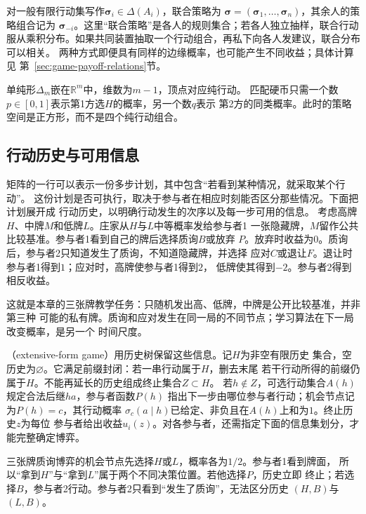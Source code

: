 对一般有限行动集写作\(\bm\sigma_i\in\Delta(A_i)\)，联合策略为
\(\bm\sigma=(\bm\sigma_1,\ldots,\bm\sigma_n)\)，其余人的策略组合记为
\(\bm\sigma_{-i}\)。这里“联合策略”是各人的规则集合；若各人独立抽样，联合行动
服从乘积分布。如果共同装置抽取一个行动组合，再私下向各人发建议，联合分布可以相关。
两种方式即便具有同样的边缘概率，也可能产生不同收益；具体计算见
第~\ref{sec:game-payoff-relations}节。

单纯形\(\Delta_m\)嵌在\(\mathbb R^m\)中，维数为\(m-1\)，顶点对应纯行动。
匹配硬币只需一个数\(p\in[0,1]\)表示第1方选\(H\)的概率，另一个数\(q\)表示
第2方的同类概率。此时的策略空间是正方形，而不是四个纯行动组合。

\subsection{行动历史与可用信息}
\label{sec:game-extensive-information}

矩阵的一行可以表示一份多步计划，其中包含“若看到某种情况，就采取某个行动”。
这份计划是否可执行，取决于参与者在相应时刻能否区分那些情况。下面把计划展开成
行动历史，以明确行动发生的次序以及每一步可用的信息。
考虑高牌\(H\)、中牌\(M\)和低牌\(L\)。庄家从\(H\)与\(L\)中等概率发给参与者1
一张隐藏牌，\(M\)留作公共比较基准。参与者1看到自己的牌后选择质询\(B\)或放弃
\(P\)。放弃时收益为\(0\)。质询后，参与者2只知道发生了质询，不知道隐藏牌，并选择
应对\(C\)或退让\(F\)。退让时参与者1得到\(1\)；应对时，高牌使参与者1得到\(2\)，
低牌使其得到\(-2\)。参与者2得到相反收益。

这就是本章的三张牌教学任务：只随机发出高、低牌，中牌是公开比较基准，并非第三种
可能的私有牌。质询和应对发生在同一局的不同节点；学习算法在下一局改变概率，是另一个
时间尺度。
\begin{definition}[有限扩展式博弈的历史树]
\label{def:game-finite-extensive-history}
（extensive-form game）用历史树保留这些信息。记\(H\)为非空有限历史
集合，空历史为\(\varnothing\)。它满足前缀封闭：若一串行动属于\(H\)，删去末尾
若干行动所得的前缀仍属于\(H\)。不能再延长的历史组成终止集合\(Z\subset H\)。
若\(h\notin Z\)，可选行动集合\(A(h)\)规定合法后继\(ha\)，参与者函数\(P(h)\)
指出下一步由哪位参与者行动；机会节点记为\(P(h)=c\)，其行动概率
\(\sigma_c(a\mid h)\)已给定、非负且在\(A(h)\)上和为\(1\)。终止历史\(z\)为每位
参与者给出收益\(u_i(z)\)。对各参与者，还需指定下面的信息集划分，才能完整确定博弈。
\end{definition}

三张牌质询博弈的机会节点先选择\(H\)或\(L\)，概率各为\(1/2\)。参与者1看到牌面，
所以“拿到\(H\)”与“拿到\(L\)”属于两个不同决策位置。若他选择\(P\)，历史立即
终止；若选择\(B\)，参与者2行动。参与者2只看到“发生了质询”，无法区分历史
\((H,B)\)与\((L,B)\)。

